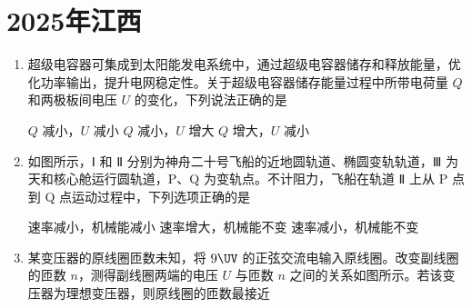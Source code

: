 \documentclass[\gkver]{gaokaozhenti}
\begin{document}
\chapter{2025年江西}

\begin{enumerate}
\item
超级电容器可集成到太阳能发电系统中，通过超级电容器储存和释放能量，优化功率输出，提升电网稳定性。关于超级电容器储存能量过程中所带电荷量 $Q$ 和两极板间电压 $U$ 的变化，下列说法正确的是

{$Q$ 减小，$U$ 减小}
{$Q$ 减小，$U$ 增大}
{$Q$ 增大，$U$ 减小}


\item
如图所示，Ⅰ 和 Ⅱ 分别为神舟二十号飞船的近地圆轨道、椭圆变轨轨道，Ⅲ 为天和核心舱运行圆轨道，P、Q 为变轨点。不计阻力，飞船在轨道 Ⅱ 上从 P 点到 Q 点运动过程中，下列选项正确的是


{速率减小，机械能减小}
{速率增大，机械能不变}
{速率减小，机械能不变}


\item
某变压器的原线圈匝数未知，将 $9 \UV$ 的正弦交流电输入原线圈。改变副线圈的匝数 $n$，测得副线圈两端的电压 $U$ 与匝数 $n$ 之间的关系如图所示。若该变压器为理想变压器，则原线圈的匝数最接近 


\end{enumerate}
\end{document}

